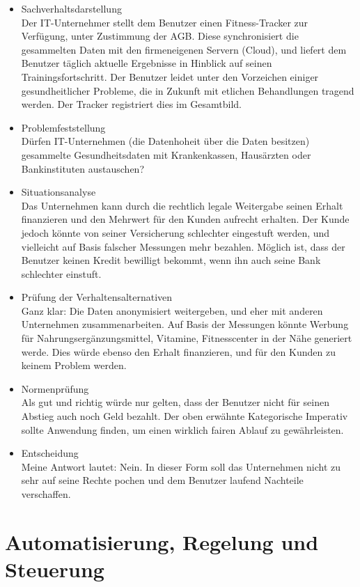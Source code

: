 \documentclass[letterpaper, 12pt]{article}
\let\tempsection\section
\renewcommand\section[1]{\vspace{-0.3cm}\tempsection{#1}\vspace{-0.3cm}}
\begin{document}
\begin{itemize}
	\item Sachverhaltsdarstellung \\
	Der IT-Unternehmer stellt dem Benutzer einen Fitness-Tracker zur Verfügung, unter Zustimmung der AGB. Diese synchronisiert die gesammelten Daten mit den firmeneigenen Servern (Cloud), und liefert dem Benutzer täglich aktuelle Ergebnisse in Hinblick auf seinen Trainingsfortschritt. Der Benutzer leidet unter den Vorzeichen einiger gesundheitlicher Probleme, die in Zukunft mit etlichen Behandlungen tragend werden. Der Tracker registriert dies im Gesamtbild.
	\item Problemfeststellung \\
	Dürfen IT-Unternehmen (die Datenhoheit über die Daten besitzen) gesammelte Gesundheitsdaten mit Krankenkassen, Hausärzten oder Bankinstituten austauschen?
	\item Situationsanalyse \\
	Das Unternehmen kann durch die rechtlich legale Weitergabe seinen Erhalt finanzieren und den Mehrwert für den Kunden aufrecht erhalten. Der Kunde jedoch könnte von seiner Versicherung schlechter eingestuft werden, und vielleicht auf Basis falscher Messungen mehr bezahlen. Möglich ist, dass der Benutzer keinen Kredit bewilligt bekommt, wenn ihn auch seine Bank schlechter einstuft.
	\item Prüfung der Verhaltensalternativen \\
	Ganz klar: Die Daten anonymisiert weitergeben, und eher mit anderen Unternehmen zusammenarbeiten. Auf Basis der Messungen könnte Werbung für Nahrungsergänzungsmittel, Vitamine, Fitnesscenter in der Nähe generiert werde. Dies würde ebenso den Erhalt finanzieren, und für den Kunden zu keinem Problem werden.
	\item Normenprüfung \\
	Als gut und richtig würde nur gelten, dass der Benutzer nicht für seinen Abstieg auch noch Geld bezahlt. Der oben erwähnte Kategorische Imperativ sollte Anwendung finden, um einen wirklich fairen Ablauf zu gewährleisten.
	\item Entscheidung \\
	Meine Antwort lautet: Nein. In dieser Form soll das Unternehmen nicht zu sehr auf seine Rechte pochen und dem Benutzer laufend Nachteile verschaffen.
\end{itemize}

\clearpage

\section{Automatisierung, Regelung und Steuerung}
\end{document}
